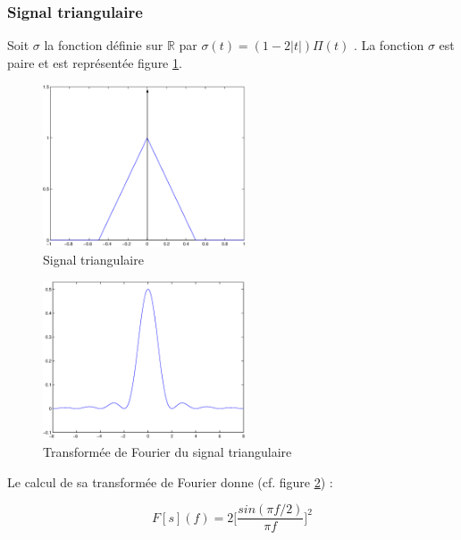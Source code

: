 \subsubsection{Signal triangulaire}
Soit $\sigma$ la fonction définie sur $\mathbb{R}$ par $\sigma(t)=(1 -2|t|)\Pi (t)$ . La fonction $\sigma$ est paire et est représentée figure \ref{triang}.
\begin{figure}[htbp]
\centerline{
\includegraphics[width=6cm]{triang.eps}}
\caption{Signal triangulaire}
\label{triang}
\end{figure}
\begin{figure}[htbp]
\centerline{
\includegraphics[width=6cm]{sinca2.eps}}
\caption{Transformée de Fourier du signal triangulaire}
\label{sinca2}
\end{figure}

Le calcul de sa transformée de Fourier donne (cf. figure \ref{sinca2}) :

$$F[s](f)=2{[\frac{sin(\pi f/2)}{\pi f}}]^{2}$$

